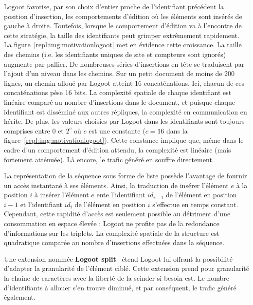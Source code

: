 \noindent Logoot favorise, par son choix d'entier proche de l'identifiant
précédent la position d'insertion, les comportements d'édition où les éléments
sont insérés de gauche à droite. Toutefois, lorsque le comportement d'édition va
à l'encontre de cette stratégie, la taille des identifiants peut grimper
extrêmement rapidement. La figure~\ref{repl:img:motivationlogoot} met en
évidence cette croissance. La taille des chemins (i.e. les identifiants uniques
de site et compteurs sont ignorés) augmente par pallier. De nombreuses séries
d'insertions en tête se traduisent par l'ajout d'un niveau dans les chemins. Sur
un petit document de moins de 200 lignes, un chemin alloué par Logoot atteint 16
concaténations. Ici, chacun de ces concaténations pèse 16 bits.  La complexité
spatiale de chaque identifiant est linéaire comparé au nombre d'insertions dans
le document, et puisque chaque identifiant est disséminé aux autres répliques,
la complexité en communication en hérite. De plus, les valeurs choisies par
Logoot dans les identifiants sont toujours comprises entre $0$ et $2^{c}$ où $c$
est une constante ($c = 16$ dans la
figure~\ref{repl:img:motivationlogoot}). Cette constance implique que, même dans
le cadre d'un comportement d'édition attendu, la complexité est linéaire (mais
fortement atténuée). Là encore, le trafic généré en souffre directement.

\noindent La représentation de la séquence sous forme de liste possède
l'avantage de fournir un accès instantané à ses éléments. Ainsi, la traduction
de \og insérer l'élément $e$ à la position $i$ \fg à \og insérer l'élément $e$
ente l'identifiant $id_{i-1}$ de l'élément en position $i-1$ et l'identifiant
$id_i$ de l'élément en position $i$ \fg s'effectue en temps constant.
Cependant, cette rapidité d'accès est seulement possible au détriment d'une
consommation en espace élevée : Logoot ne profite pas de la redondance
d'informations sur les triplets. La complexité spatiale de la structure est
quadratique comparée au nombre d'insertions effectuées dans la séquence.

\noindent Une extension nommée \textbf{Logoot split}~\cite{andre2013supporting}
étend Logoot lui offrant la possibilité d'adapter la granularité de l'élément
ciblé.  Cette extension prend pour granularité la chaîne de caractères avec la
liberté de la scinder si besoin est. Le nombre d'identifiants à allouer s'en
trouve diminué, et par conséquent, le trafic généré également.

